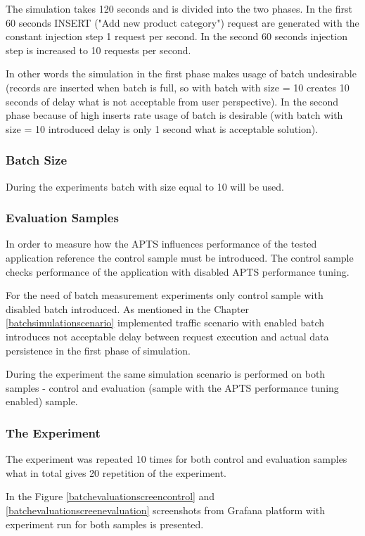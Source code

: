 \documentclass[10pt,a4paper]{article}
\begin{document}
The simulation takes 120 seconds and is divided into the two phases. In the first 60 seconds INSERT ("Add new product category") request are generated with the constant injection step 1 request per second. In the second 60 seconds injection step is increased to 10 requests per second. 

In other words the simulation in the first phase makes usage of batch undesirable (records are inserted when batch is full, so with batch with size = 10 creates 10 seconds of delay what is not acceptable from user perspective). In the second phase because of high inserts rate usage of batch is desirable (with batch with size = 10 introduced delay is only 1 second what is acceptable solution).  
 
\subsubsection{Batch Size} 
During the experiments batch with size equal to 10 will be used. 


\subsubsection{Evaluation Samples} 

In order to measure how the APTS influences performance of the tested application reference the control sample must be introduced. The control sample checks performance of the application with disabled APTS performance tuning. 

For the need of batch measurement experiments only control sample with disabled batch introduced. As mentioned in the Chapter \ref{batchsimulationscenario} implemented traffic scenario with enabled batch introduces not acceptable delay between request execution and actual data persistence in the first phase of simulation. 

During the experiment the same simulation scenario is performed on both samples - control and evaluation (sample with the APTS performance tuning enabled) sample.

\subsubsection{The Experiment} 

The experiment was repeated 10 times for both control and evaluation samples what in total gives 20 repetition of the experiment. 

In the Figure \ref{batchevaluationscreencontrol} and \ref{batchevaluationscreenevaluation} screenshots from Grafana platform with experiment run for both samples is presented. 
\end{document}
